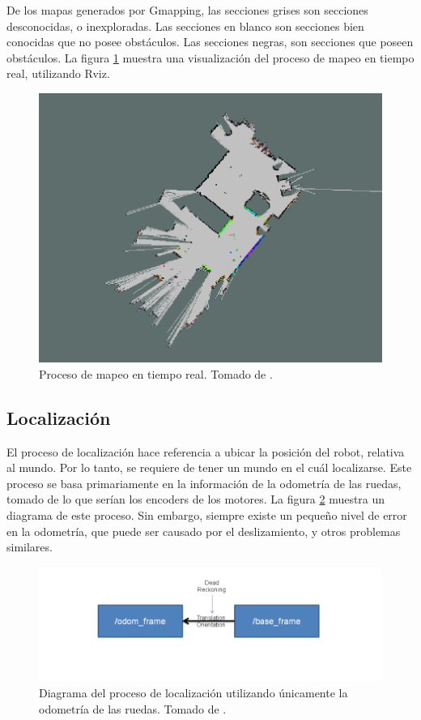 De los mapas generados por Gmapping, las secciones grises son secciones desconocidas, o inexploradas. Las secciones en blanco son secciones bien conocidas que no posee obstáculos. Las secciones negras, son secciones que poseen obstáculos. La figura \ref{F:mapeando} muestra una visualización del proceso de mapeo en tiempo real, utilizando Rviz.

\begin{figure}[H]
\centering
\includegraphics[scale=0.4]{imagenes/map-gmapping.png}
\caption{Proceso de mapeo en tiempo real. Tomado de \cite{Grisetti2007}.}
\label{F:mapeando}
\end{figure}

\subsection{Localización}

El proceso de localización hace referencia a ubicar la posición del robot, relativa al mundo. Por lo tanto, se requiere de tener un mundo en el cuál localizarse. Este proceso se basa primariamente en la información de la odometría de las ruedas, tomado de lo que serían los encoders de los motores. La figura \ref{F:acml1} muestra un diagrama de este proceso. Sin embargo, siempre existe un pequeño nivel de error en la odometría, que puede ser causado por el deslizamiento, y otros problemas similares.

\begin{figure}[H]
\centering
\includegraphics[scale=0.4]{imagenes/diagrama_amcl.png}
\caption{Diagrama del proceso de localización utilizando únicamente la odometría de las ruedas. Tomado de \cite{ROSAMCL}.}
\label{F:acml1}
\end{figure}

